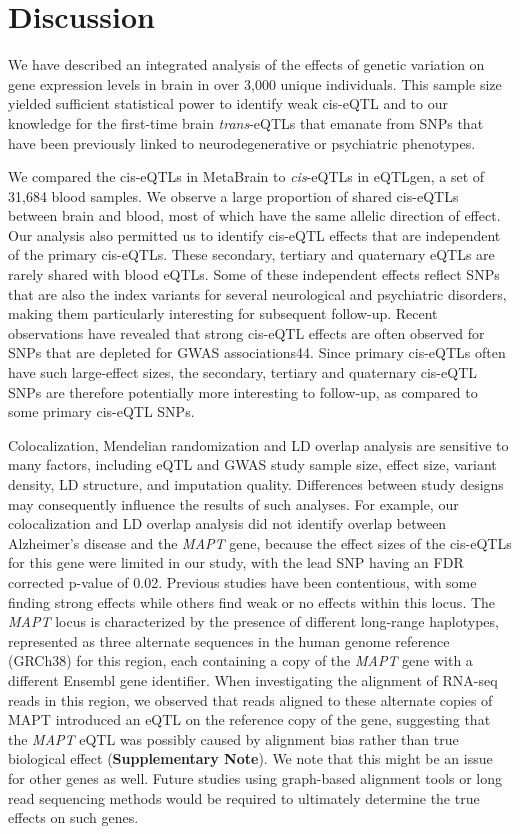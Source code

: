 \section{Discussion}

We have described an integrated analysis of the effects of genetic variation on gene expression levels in brain in over 3,000 unique individuals. This sample size yielded sufficient statistical power to identify weak cis-eQTL and to our knowledge for the first-time brain \emph{trans}-eQTLs that emanate from SNPs that have been previously linked to neurodegenerative or psychiatric phenotypes. 

We compared the cis-eQTLs in MetaBrain to \emph{cis}-eQTLs in eQTLgen, a set of 31,684 blood samples. We observe a large proportion of shared cis-eQTLs between brain and blood, most of which have the same allelic direction of effect. Our analysis also permitted us to identify cis-eQTL effects that are independent of the primary cis-eQTLs. These secondary, tertiary and quaternary eQTLs are rarely shared with blood eQTLs. Some of these independent effects reflect SNPs that are also the index variants for several neurological and psychiatric disorders, making them particularly interesting for subsequent follow-up. Recent observations have revealed that strong cis-eQTL effects are often observed for SNPs that are depleted for GWAS associations44. Since primary cis-eQTLs often have such large-effect sizes, the secondary, tertiary and quaternary cis-eQTL SNPs are therefore potentially more interesting to follow-up, as compared to some primary cis-eQTL SNPs. 

Colocalization, Mendelian randomization and LD overlap analysis are sensitive to many factors, including eQTL and GWAS study sample size, effect size, variant density, LD structure, and imputation quality. Differences between study designs may consequently influence the results of such analyses. For example, our colocalization and LD overlap analysis did not identify overlap between Alzheimer’s disease and the \emph{MAPT} gene, because the effect sizes of the cis-eQTLs for this gene were limited in our study, with the lead SNP having an FDR corrected p-value of 0.02. Previous studies have been contentious, with some finding strong effects\cite{wangComprehensiveFunctionalGenomic2018,ngXQTLMapIntegrates2017} while others find weak or no effects within this locus\cite{aguetGeneticEffectsGene2017,siebertsLargeEQTLMetaanalysis2020}. The \emph{MAPT} locus is characterized by the presence of different long-range haplotypes, represented as three alternate sequences in the human genome reference (GRCh38) for this region, each containing a copy of the \emph{MAPT} gene with a different Ensembl gene identifier. When investigating the alignment of RNA-seq reads in this region, we observed that reads aligned to these alternate copies of MAPT introduced an eQTL on the reference copy of the gene, suggesting that the \emph{MAPT} eQTL was possibly caused by alignment bias rather than true biological effect (\textbf{Supplementary Note}). We note that this might be an issue for other genes as well. Future studies using graph-based alignment tools or long read sequencing methods would be required to ultimately determine the true effects on such genes. 

